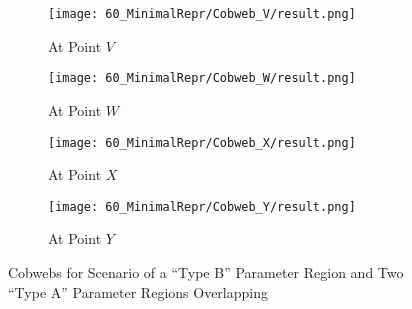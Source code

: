 \begin{figure}
    \centering
    \begin{subfigure}{0.4\textwidth}
        \texttt{[image: 60\_MinimalRepr/Cobweb\_V/result.png]}
        \caption{At Point $V$}
        \label{fig:minrep.cobweb.V}
    \end{subfigure}
    \begin{subfigure}{0.4\textwidth}
        \texttt{[image: 60\_MinimalRepr/Cobweb\_W/result.png]}
        \caption{At Point $W$}
        \label{fig:minrep.cobweb.W}
    \end{subfigure}
    \begin{subfigure}{0.4\textwidth}
        \texttt{[image: 60\_MinimalRepr/Cobweb\_X/result.png]}
        \caption{At Point $X$}
        \label{fig:minrep.cobweb.X}
    \end{subfigure}
    \begin{subfigure}{0.4\textwidth}
        \texttt{[image: 60\_MinimalRepr/Cobweb\_Y/result.png]}
        \caption{At Point $Y$}
        \label{fig:minrep.cobweb.Y}
    \end{subfigure}
    \caption{Cobwebs for Scenario of a ``Type B'' Parameter Region and Two ``Type A'' Parameter Regions Overlapping}
\end{figure}
